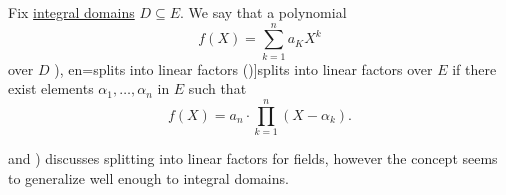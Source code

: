 \begin{definition}\label{def:polynomial_splits_into_linear_factors}\mimprovised
  Fix \hyperref[def:integral_domain]{integral domains} \( D \subseteq E \). We say that a polynomial
  \begin{equation*}
    f(X) = \sum_{k=1}^n a_K X^k
  \end{equation*}
  over \( D \) \term[ru=разлагается на линейные множители (\cite[\S 17.6]{Тыртышников2007ЛинейнаяАлгебра}), en=splits into linear factors (\cite[235]{Lang2002Algebra})]{splits into linear factors} over \( E \) if there exist elements \( \alpha_1, \ldots, \alpha_n \) in \( E \) such that
  \begin{equation}\label{eq:def:polynomial_splits_into_linear_factors}
    f(X) = a_n \cdot \prod_{k=1}^n (X - \alpha_k).
  \end{equation}
\end{definition}
\begin{comments}
  \item {} and ) discusses splitting into linear factors for fields, however the concept seems to generalize well enough to integral domains.
\end{comments}

